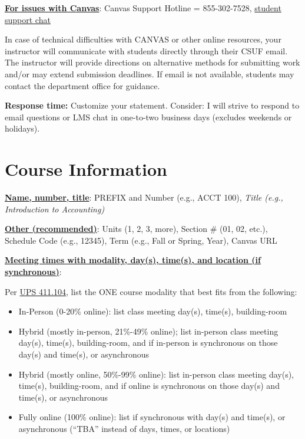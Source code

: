 \documentclass[12pt]{article}
\begin{document}
\textbf{\uline{For issues with Canvas}}: {\color{suggestionred}Canvas Support Hotline = 855-302-7528, \href{https://cases.canvaslms.com/liveagentchat?chattype=student&sfid=001A000000YzcwQIAR}{student support chat}}

{\color{suggestionred}In case of technical difficulties with CANVAS or other online resources, your instructor will communicate with students directly through their CSUF email. The instructor will provide directions on alternative methods for submitting work and/or may extend submission deadlines. If email is not available, students may contact the department office for guidance.}

\textbf{Response time:} {\color{annotationblue}Customize your statement.} {\color{suggestionred}Consider: I will strive to respond to email questions or LMS chat in one-to-two business days (excludes weekends or holidays).}

\section{Course Information}

\textbf{\uline{Name, number, title}}: PREFIX and Number (e.g., ACCT 100), \emph{Title (e.g., Introduction to Accounting)}

\textbf{\uline{Other (recommended)}}: Units (1, 2, 3, more), Section \# (01, 02, etc.), Schedule Code (e.g., 12345), Term (e.g., Fall or Spring, Year), Canvas URL

\textbf{\uline{Meeting times with modality, day(s), time(s), and location (if synchronous)}}:

{\color{annotationblue}Per \href{https://www.fullerton.edu/senate/publications_policies_resolutions/ups/UPS\%20400/UPS\%20411.104.pdf}{UPS 411.104}, list the ONE course modality that best fits from the following:}

\begin{itemize}
\item In-Person (0-20\% online): list class meeting day(s), time(s), building-room
\item Hybrid (mostly in-person, 21\%-49\% online); list in-person class meeting day(s), time(s), building-room, and if in-person is synchronous on those day(s) and time(s), or asynchronous
\item Hybrid (mostly online, 50\%-99\% online): list in-person class meeting day(s), time(s), building-room, and if online is synchronous on those day(s) and time(s), or asynchronous
\item Fully online (100\% online): list if synchronous with day(s) and time(s), or asynchronous (``TBA'' instead of days, times, or locations)
\end{itemize}
\end{document}
